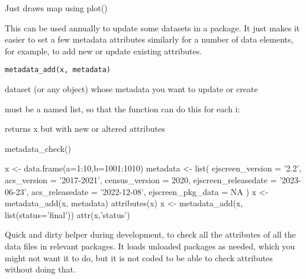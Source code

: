 \documentclass[a4paper]{book}
\begin{document}
%
\begin{Value}
Just draws map using plot()
\end{Value}
%
\begin{Description}\relax
This can be used annually to update some datasets in a package.
It just makes it easier to set a few metadata attributes similarly
for a number of data elements, for example,
to add new or update existing attributes.
\end{Description}
%
\begin{Usage}
\begin{verbatim}
metadata_add(x, metadata)
\end{verbatim}
\end{Usage}
%
\begin{Arguments}
\begin{ldescription}
\item[\code{x}] dataset (or any object) whose metadata you want to update or create

\item[\code{metadata}] must be a named list, so that the function can do this for each i:
\end{ldescription}
\end{Arguments}
%
\begin{Value}
returns x but with new or altered attributes
\end{Value}
%
\begin{SeeAlso}\relax
metadata\_check()
\end{SeeAlso}
%
\begin{Examples}
\begin{ExampleCode}
  x <- data.frame(a=1:10,b=1001:1010)
  metadata <- list(
  ejscreen_version =  '2.2',
  acs_version =          '2017-2021',
  census_version = 2020,
  ejscreen_releasedate = '2023-06-23',
  acs_releasedate =      '2022-12-08',
  ejscreen_pkg_data = NA
  )
  x <- metadata_add(x, metadata)
  attributes(x)
  x <- metadata_add(x, list(status='final'))
  attr(x,'status')
\end{ExampleCode}
\end{Examples}
%
\begin{Description}\relax
Quick and dirty helper during development, to check all the
attributes of all the data files in relevant packages.
It loads unloaded packages as needed, which you might not want it to do,
but it is not coded to be able to check attributes without doing that.
\end{Description}
\end{document}
